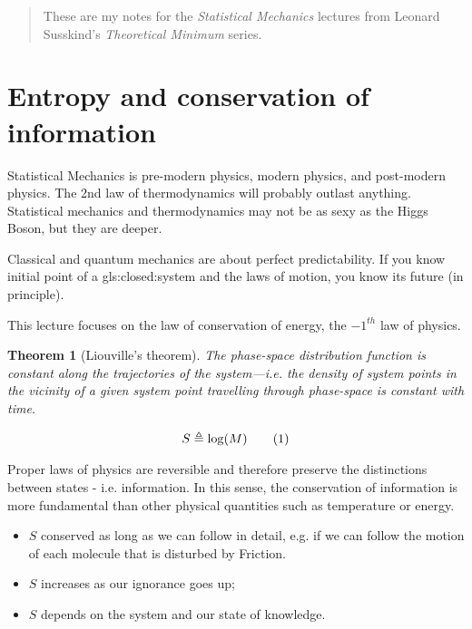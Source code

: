 \documentclass[]{article}
\newcommand\numberthis{\addtocounter{equation}{1}\tag{\theequation}}
\newtheorem{thm}{Theorem}
\begin{document}
\begin{abstract}
	These are my notes for the \emph{Statistical Mechanics} lectures\cite{susskind2013statistical} from Leonard Susskind's \emph{Theoretical Minimum} series\cite{susskind2007theoretical}.
\end{abstract}

\tableofcontents

\listoffigures


\section{Entropy and conservation of information}

Statistical Mechanics is pre-modern physics, modern physics, and post-modern physics. The 2nd law of thermodynamics will probably outlast anything. Statistical mechanics and thermodynamics may not be as sexy as the Higgs Boson, but they are deeper.

Classical and quantum mechanics are about perfect predictability. If you know initial point of a \gls{gls:closed:system} and the laws of motion, you know its future (in principle).

This lecture focuses on the law of conservation of energy, the $-1^{th}$ law of physics. 

\begin{thm}[Liouville's theorem]
	The phase-space distribution function is constant along the trajectories of the system—i.e. the density of system points in the vicinity of a given system point travelling through phase-space is constant with time.
\end{thm}

\begin{align*}
S \triangleq \log(M) \numberthis \label{eq:entropy:simple}
\end{align*}

Proper laws of physics are reversible and therefore preserve the distinctions between states - i.e. information.  In this sense, the conservation of information is more fundamental than other physical quantities such as temperature or energy.  
\begin{itemize}
	\item $S$ conserved as long as we can follow in detail, e.g. if we can follow the motion of each molecule that is disturbed by Friction.
	\item $S$ increases as our ignorance goes up;
	\item $S$ depends on the system and our state of knowledge.
\end{itemize}
\end{document}

